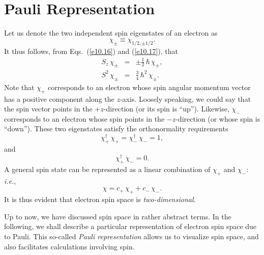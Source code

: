 \section{Pauli Representation}\label{spauli}
Let us denote the two independent spin eigenstates of an electron as
\begin{equation}
\chi_\pm \equiv \chi_{1/2,\pm 1/2}.
\end{equation}
It thus follows, from Eqs.~(\ref{e10.16}) and (\ref{e10.17}), that
\begin{eqnarray}
S_z\,\chi_\pm &=& \pm \frac{1}{2}\,\hbar\,\chi_\pm,\label{e10.34}\\[0.5ex]
S^2\,\chi_\pm &=& \frac{3}{4}\,\hbar^2\,\chi_\pm.
\end{eqnarray}
Note that $\chi_+$ corresponds to an electron whose spin angular momentum vector has a positive component along the $z$-axis. Loosely speaking,
we could say that the spin vector points in the $+z$-direction (or its spin is
``up''). Likewise,
$\chi_-$ corresponds to an electron whose spin points in  the $-z$-direction
(or whose spin is ``down'').
These two eigenstates satisfy the orthonormality requirements
\begin{equation}\label{e10.35}
\chi_+^\dag\,\chi_+ = \chi_-^\dag\,\chi_- = 1,
\end{equation}
and
\begin{equation}\label{e10.36}
\chi_+^\dag\,\chi_- = 0.
\end{equation}
A general spin state can be represented as a linear combination of
$\chi_+$ and $\chi_-$: {\em i.e.},
\begin{equation}
\chi = c_+\,\chi_+ + c_-\,\chi_-.
\end{equation}
It is thus evident that electron spin space is {\em two-dimensional}.

Up to now, we have discussed spin space in rather abstract terms. In the
following, we shall describe a particular representation of electron
spin space due to Pauli. This so-called {\em Pauli representation}\/ allows us
to visualize spin space, and also facilitates calculations involving spin.

